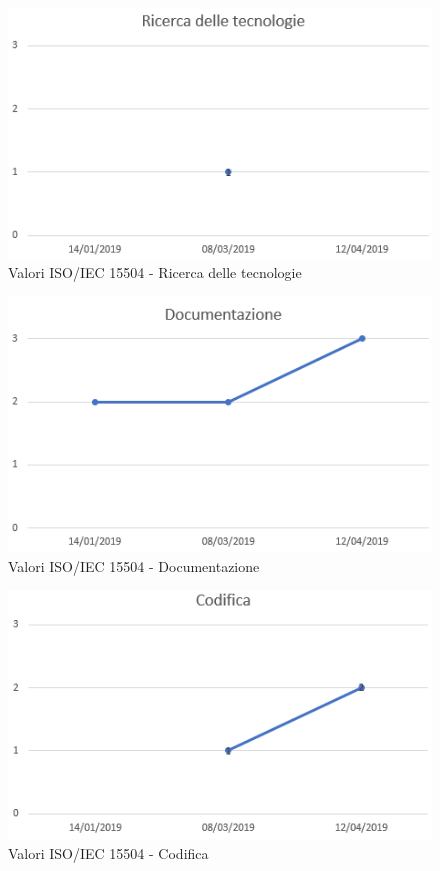 \begin{figure}[H]
	\centering
	\includegraphics[scale=1]{images/resoconto/Ricerca.png}
	\caption{Valori ISO/IEC 15504 - Ricerca delle tecnologie}	
\end{figure}


\begin{figure}[H]
	\centering
	\includegraphics[scale=1]{images/resoconto/Documentazione.png}
	\caption{Valori ISO/IEC 15504 - Documentazione}	
\end{figure}


\begin{figure}[H]
	\centering
	\includegraphics[scale=1]{images/resoconto/Codifica.png}
	\caption{Valori ISO/IEC 15504 - Codifica}	
\end{figure}

